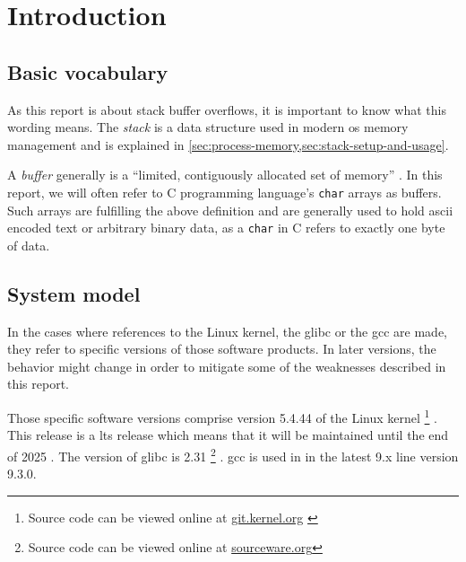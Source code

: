 \chapter{Introduction}
\label{chp:introduction}


\section{Basic vocabulary}
As this report is about stack buffer overflows, it is important to know what this wording means.
The \emph{stack} is a data structure used in modern \gls{os} memory management and is explained in \cref{sec:process-memory,sec:stack-setup-and-usage}.

A \emph{buffer} generally is a ``limited, contiguously allocated set of memory'' \cite[12]{Anley2007}.
In this report, we will often refer to C programming language's \texttt{char} arrays as buffers.
Such arrays are fulfilling the above definition and are generally used to hold \gls{ascii} encoded text or arbitrary binary data, as a \texttt{char} in C refers to exactly one byte of data.

\section{System model}
\label{sec:system-model}

In the cases where references to the Linux kernel, the \gls{glibc} or the \gls{gcc} are made, they refer to specific versions of those software products.
In later versions, the behavior might change in order to mitigate some of the weaknesses described in this report.

Those specific software versions comprise version 5.4.44 of the Linux kernel%
	\footnote{Source code can be viewed online at \href{https://git.kernel.org/stable/h/v5.4.44}{git.kernel.org} \cite{LKD2020}}%
.
This release is a \gls{lts} release which means that it will be maintained until the end of 2025 \cite{LKO2020}.
The version of \gls{glibc} is 2.31%
	\footnote{Source code can be viewed online at \href{https://sourceware.org/git/?p=glibc.git;a=tree;h=6ee690ef6fa36bf79d2e05b5a30a4f7e10ba3937;hb=9ea3686266dca3f004ba874745a4087a89682617}{sourceware.org}}%
.
\gls{gcc} is used in in the latest 9.x line version 9.3.0.

